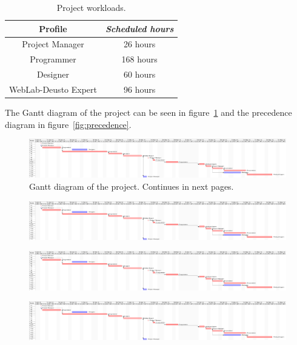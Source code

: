 \begin{table}[h]
	\centering
	\caption{Project workloads.}\label{tab:work}
	\begin{tabular}{cc}
		\toprule
		\textbf{Profile} & \emph{Scheduled hours} \\
		\midrule
		Project Manager			&	26 hours	\\
		Programmer				&	168 hours	\\
		Designer				&	60 hours	\\
		WebLab-Deusto Expert	&	96 hours	\\
		\bottomrule
	\end{tabular}
\end{table}

The Gantt diagram of the project can be seen in figure~\ref{fig:gantt} and the precedence diagram in
figure~\ref{fig:precedence}.

\clearpage
\begin{figure}
	\centering
	\includegraphics[trim=0in 0in 26in 0in, clip, angle=90]{fig/gantt}
	\caption[Gantt diagram of the project.]{Gantt diagram of the project. Continues in next
	pages.}\label{fig:gantt}
\end{figure}
\clearpage

\begin{figure}
	\centering
	\includegraphics[trim=7.82in 0in 17in 0in, clip, angle=90]{fig/gantt}
\end{figure}
\clearpage

\begin{figure}
	\centering
	\includegraphics[trim=16.82in 0in 8in 0in, clip, angle=90]{fig/gantt}
\end{figure}
\clearpage

\begin{figure}
	\centering
	\includegraphics[trim=25.82in 0in 0in 0in, clip, angle=90]{fig/gantt}
\end{figure}
\clearpage

